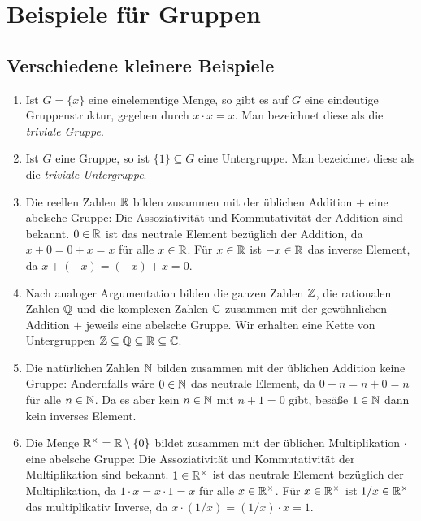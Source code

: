 \chapter{Beispiele für Gruppen}





\section{Verschiedene kleinere Beispiele}





\begin{enumerate}[leftmargin=*]
 \item
  Ist $G = \{x\}$ eine einelementige Menge, so gibt es auf $G$ eine eindeutige Gruppenstruktur, gegeben durch $x \cdot x = x$. Man bezeichnet diese als die \emph{triviale Gruppe}.
 \item
  Ist $G$ eine Gruppe, so ist $\{1\} \subseteq G$ eine Untergruppe. Man bezeichnet diese als die \emph{triviale Untergruppe}.
 \item
  Die reellen Zahlen $\mathbb{R}$ bilden zusammen mit der üblichen Addition $+$ eine abelsche Gruppe: Die Assoziativität und Kommutativität der Addition sind bekannt. $0 \in \mathbb{R}$ ist das neutrale Element bezüglich der Addition, da $x + 0 = 0 + x = x$ für alle $x \in \mathbb{R}$. Für $x \in \mathbb{R}$ ist $-x \in \mathbb{R}$ das inverse Element, da $x + (-x) = (-x) + x = 0$.
 \item
  Nach analoger Argumentation bilden die ganzen Zahlen $\mathbb{Z}$, die rationalen Zahlen $\mathbb{Q}$ und die komplexen Zahlen $\mathbb{C}$ zusammen mit der gewöhnlichen Addition $+$ jeweils eine abelsche Gruppe. Wir erhalten eine Kette von Untergruppen $\mathbb{Z} \subseteq \mathbb{Q} \subseteq \mathbb{R} \subseteq \mathbb{C}$.
 \item
  Die natürlichen Zahlen $\mathbb{N}$ bilden zusammen mit der üblichen Addition keine Gruppe: Andernfalls wäre $0 \in \mathbb{N}$ das neutrale Element, da $0+n = n+0 = n$ für alle $n \in \mathbb{N}$. Da es aber kein $n \in \mathbb{N}$ mit $n+1 = 0$ gibt, besäße $1 \in \mathbb{N}$ dann kein inverses Element.
 \item
  Die Menge $\mathbb{R}^\times = \mathbb{R} \setminus \{0\}$ bildet zusammen mit der üblichen Multiplikation $\cdot$ eine abelsche Gruppe: Die Assoziativität und Kommutativität der Multiplikation sind bekannt. $1 \in \mathbb{R}^\times$ ist das neutrale Element bezüglich der Multiplikation, da $1 \cdot x = x \cdot 1 = x$ für alle $x \in \mathbb{R}^\times$. Für $x \in \mathbb{R}^\times$ ist $1/x \in \mathbb{R}^\times$ das multiplikativ Inverse, da $x \cdot (1/x) = (1/x) \cdot x = 1$.

\end{enumerate}
